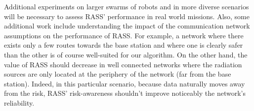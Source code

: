 Additional experiments on larger swarms of robots and in more diverse scenarios will be necessary to assess RASS' performance in real world missions. Also, some additional work include understanding the impact of the communication network assumptions on the performance of RASS. For example, a network where there exists only a few routes towards the base station and where one is clearly safer than the other is of course well-suited for our algorithm. On the other hand, the value of RASS should decrease in well connected networks where the radiation sources are only located at the periphery of the network (far from the base station). Indeed, in this particular scenario, because data naturally moves away from the risk, RASS' risk-awareness shouldn't improve noticeably the network's reliability.

